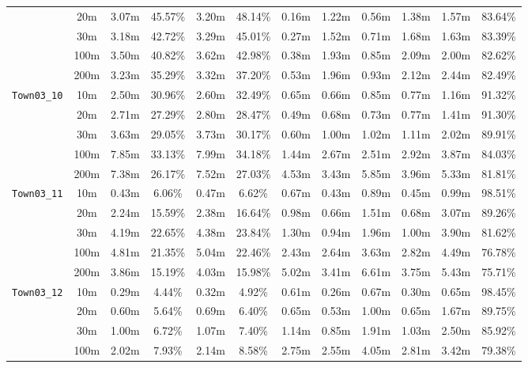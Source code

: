 \begin{table}
{\begin{tabular}{@{}cccccccccccc@{}}
      & 20m & 3.07m & 45.57\% & 3.20m & 48.14\% & 0.16m & 1.22m & 0.56m & 1.38m & 1.57m & 83.64\% \\
      & 30m & 3.18m & 42.72\% & 3.29m & 45.01\% & 0.27m & 1.52m & 0.71m & 1.68m & 1.63m & 83.39\% \\
      & 100m & 3.50m & 40.82\% & 3.62m & 42.98\% & 0.38m & 1.93m & 0.85m & 2.09m & 2.00m & 82.62\% \\
      & 200m & 3.23m & 35.29\% & 3.32m & 37.20\% & 0.53m & 1.96m & 0.93m & 2.12m & 2.44m & 82.49\% \\
      \midrule
      \multirow{5}{*}{\Verb|Town03_10|} & 10m & 2.50m & 30.96\% & 2.60m & 32.49\% & 0.65m & 0.66m & 0.85m & 0.77m & 1.16m & 91.32\% \\
      & 20m & 2.71m & 27.29\% & 2.80m & 28.47\% & 0.49m & 0.68m & 0.73m & 0.77m & 1.41m & 91.30\% \\
      & 30m & 3.63m & 29.05\% & 3.73m & 30.17\% & 0.60m & 1.00m & 1.02m & 1.11m & 2.02m & 89.91\% \\
      & 100m & 7.85m & 33.13\% & 7.99m & 34.18\% & 1.44m & 2.67m & 2.51m & 2.92m & 3.87m & 84.03\% \\
      & 200m & 7.38m & 26.17\% & 7.52m & 27.03\% & 4.53m & 3.43m & 5.85m & 3.96m & 5.33m & 81.81\% \\
      \midrule
      \multirow{5}{*}{\Verb|Town03_11|} & 10m & 0.43m & 6.06\% & 0.47m & 6.62\% & 0.67m & 0.43m & 0.89m & 0.45m & 0.99m & 98.51\% \\
      & 20m & 2.24m & 15.59\% & 2.38m & 16.64\% & 0.98m & 0.66m & 1.51m & 0.68m & 3.07m & 89.26\% \\
      & 30m & 4.19m & 22.65\% & 4.38m & 23.84\% & 1.30m & 0.94m & 1.96m & 1.00m & 3.90m & 81.62\% \\
      & 100m & 4.81m & 21.35\% & 5.04m & 22.46\% & 2.43m & 2.64m & 3.63m & 2.82m & 4.49m & 76.78\% \\
      & 200m & 3.86m & 15.19\% & 4.03m & 15.98\% & 5.02m & 3.41m & 6.61m & 3.75m & 5.43m & 75.71\% \\
      \midrule
      \multirow{5}{*}{\Verb|Town03_12|} & 10m & 0.29m & 4.44\% & 0.32m & 4.92\% & 0.61m & 0.26m & 0.67m & 0.30m & 0.65m & 98.45\% \\
      & 20m & 0.60m & 5.64\% & 0.69m & 6.40\% & 0.65m & 0.53m & 1.00m & 0.65m & 1.67m & 89.75\% \\
      & 30m & 1.00m & 6.72\% & 1.07m & 7.40\% & 1.14m & 0.85m & 1.91m & 1.03m & 2.50m & 85.92\% \\
      & 100m & 2.02m & 7.93\% & 2.14m & 8.58\% & 2.75m & 2.55m & 4.05m & 2.81m & 3.42m & 79.38\% \\

\end{tabular}}
\end{table}
